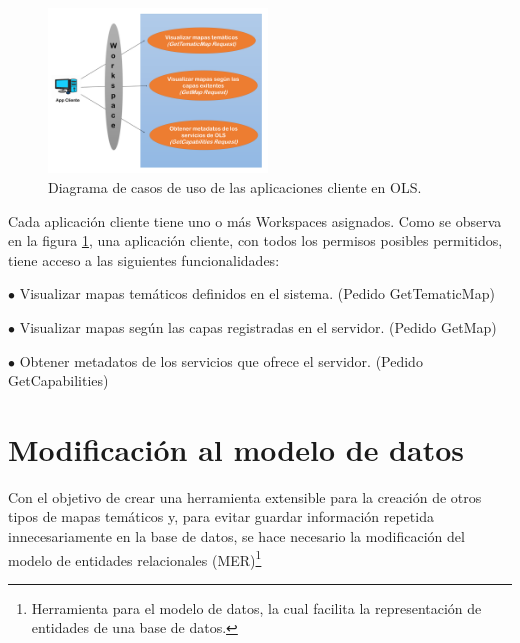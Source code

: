 \begin{figure} 
\vspace{-20pt} 
\begin{center} 
\includegraphics[width=0.52\textwidth]{images/casosdeUsoclient.png} 
\end{center} \vspace{-20pt} \caption{Diagrama de casos de uso de las aplicaciones cliente en OLS.} \label{casos2} \vspace{-10pt} 
\end{figure}

Cada aplicaci\'on cliente tiene uno o m\'as Workspaces asignados. Como se observa en la figura \ref{casos2}, una aplicaci\'on cliente, con todos los permisos posibles permitidos, tiene acceso a las siguientes funcionalidades:

$\bullet$ Visualizar mapas tem\'aticos definidos en el sistema. (Pedido GetTematicMap)

$\bullet$ Visualizar mapas seg\'un las capas registradas en el servidor. (Pedido GetMap)

$\bullet$ Obtener metadatos de los servicios que ofrece el servidor. (Pedido GetCapabilities)



\section{Modificaci\'on al modelo de datos}
Con el objetivo de crear una herramienta extensible para la creaci\'on de otros tipos de mapas tem\'aticos y, para evitar guardar informaci\'on repetida innecesariamente en la base de datos, se hace necesario la modificaci\'on del modelo de entidades relacionales (MER)\footnote{Herramienta para el modelo de datos, la cual facilita la representaci\'on de entidades de una base de datos.}

